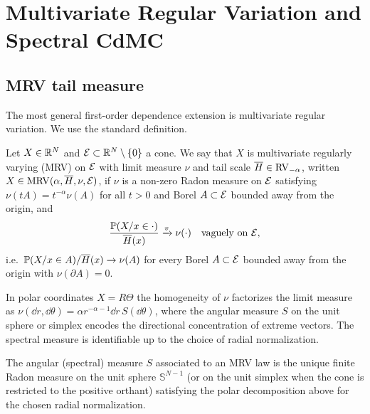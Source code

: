 \section{Multivariate Regular Variation and Spectral CdMC}
\label{sec:mrv-spectral}

\subsection{MRV tail measure}

The most general first-order dependence extension is multivariate regular
variation. We use the standard definition.

\begin{definition}
\label{def:mrv}
Let \(X\in\mathbb{R}^N\) and \(\mathcal{E}\subset\mathbb{R}^N\setminus\{0\}\) a cone. We say that
\(X\) is multivariate regularly varying (MRV) on \(\mathcal{E}\) with limit measure
\(\nu\) and tail scale \(\overline{H}\in\mathrm{RV}_{-\alpha}\), written
\(X\in\mathrm{MRV}(\alpha,\overline{H},\nu,\mathcal{E})\), if \(\nu\) is a non-zero Radon measure on
\(\mathcal{E}\) satisfying \(\nu(tA)=t^{-\alpha}\nu(A)\) for all \(t>0\) and Borel
\(A\subset\mathcal{E}\) bounded away from the origin, and
\[
  \frac{\mathbb{P}(X/x\in\cdot)}{\overline{H}(x)}\xrightarrow{v}\nu(\cdot)
  \quad\text{vaguely on }\mathcal{E},
\]
i.e.\ \(\mathbb{P}(X/x\in A)/\overline{H}(x)\to\nu(A)\) for every Borel
\(A\subset\mathcal{E}\) bounded away from the origin with \(\nu(\partial A)=0\).
\end{definition}

In polar coordinates \(X=R\Theta\) the homogeneity of \(\nu\) factorizes the
limit measure as
\(\nu(\dd r,\dd\theta)=\alpha r^{-\alpha-1}\dd r\,S(\dd\theta)\), where the
angular measure \(S\) on the unit sphere or simplex encodes the directional
concentration of extreme vectors. The spectral measure is identifiable up to
the choice of radial normalization.

\begin{definition}
\label{def:spectral-measure}
The angular (spectral) measure $S$ associated to an MRV law is the unique
finite Radon measure on the unit sphere $\mathbb{S}^{N-1}$ (or on the unit
simplex when the cone is restricted to the positive orthant) satisfying the
polar decomposition above for the chosen radial normalization.
\end{definition}

